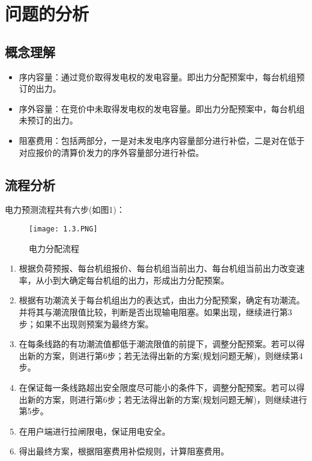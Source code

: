 \documentclass[12pt,a4paper]{ctexart}
\begin{document}
\section{问题的分析}
	\subsection{概念理解}
	\begin{itemize}
		\item 序内容量：通过竞价取得发电权的发电容量。即出力分配预案中，每台机组预订的出力。
		\item 序外容量：在竞价中未取得发电权的发电容量。即出力分配预案中，每台机组未预订的出力。
		\item 阻塞费用：包括两部分，一是对未发电序内容量部分进行补偿，二是对在低于对应报价的清算价发力的序外容量部分进行补偿。
	\end{itemize}

	
	\subsection{流程分析}
{\noindent 电力预测流程共有六步(如图1)：}\vspace{0.5em}

\begin{figure}[!h]
	\centering	%
	\texttt{[image: 1.3.PNG]} %
	\caption{电力分配流程}
\end{figure}

	\begin{enumerate}[第1步]
		\item 根据负荷预报、每台机组报价、每台机组当前出力、每台机组当前出力改变速率，从小到大确定每台机组的出力，形成出力分配预案。
		\item 根据有功潮流关于每台机组出力的表达式，由出力分配预案，确定有功潮流。并将其与潮流限值比较，判断是否出现输电阻塞。如果出现，继续进行第3步；如果不出现则预案为最终方案。
		\item 在每条线路的有功潮流值都低于潮流限值的前提下，调整分配预案。若可以得出新的方案，则进行第6步；若无法得出新的方案(规划问题无解)，则继续第4步。
		\item 在保证每一条线路超出安全限度尽可能小的条件下，调整分配预案。若可以得出新的方案，则进行第6步；若无法得出新的方案(规划问题无解)，则继续进行第5步。
		\item 在用户端进行拉闸限电，保证用电安全。
		\item 得出最终方案，根据阻塞费用补偿规则，计算阻塞费用。\\
	\end{enumerate}
	
\end{document}
